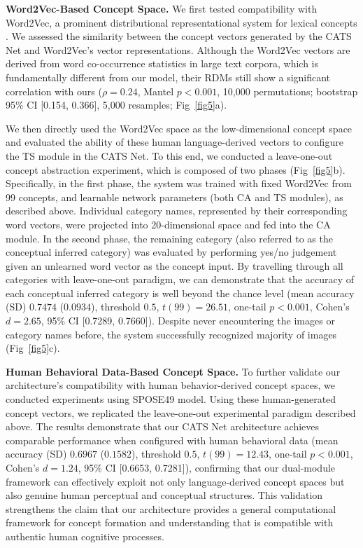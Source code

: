 \documentclass[pdflatex,sn-mathphys-num,lineno]{sn-jnl}%
\begin{document}
\begin{CJK}{UTF8}{gbsn}
\textbf{Word2Vec-Based Concept Space.} We first tested compatibility with Word2Vec, a prominent distributional representational system for lexical concepts \cite{mikolov_distributed_2013,mikolov_advances_2018}. We assessed the similarity between the concept vectors generated by the CATS Net and Word2Vec's vector representations. Although the Word2Vec vectors are derived from word co-occurrence statistics in large text corpora, which is fundamentally different from our model, their RDMs still show a significant correlation with ours ($\rho=0.24$, Mantel $p < 0.001$, 10,000 permutations; bootstrap 95\% CI [0.154, 0.366], 5,000 resamples; Fig~\ref{fig5}a). 

We then directly used the Word2Vec space as the low-dimensional concept space and evaluated the ability of these human language-derived vectors to configure the TS module in the CATS Net. To this end, we conducted a leave-one-out concept abstraction experiment, which is composed of two phases (Fig~\ref{fig5}b). Specifically, in the first phase, the system was trained with fixed Word2Vec from 99 concepts, and learnable network parameters (both CA and TS modules), as described above. Individual category names, represented by their corresponding word vectors, were projected into 20-dimensional space and fed into the CA module. In the second phase, the remaining category (also referred to as the conceptual inferred category) was evaluated by performing yes/no judgement given an unlearned word vector as the concept input. By travelling through all categories with leave-one-out paradigm, we can demonstrate that the accuracy of each conceptual inferred category is well beyond the chance level (mean accuracy (SD) $0.7474$ ($0.0934$), threshold $0.5$, $t(99)=26.51$, one-tail $p < 0.001$, Cohen's $d = 2.65$, 95\% CI [0.7289, 0.7660]). Despite never encountering the images or category names before, the system successfully recognized majority of images (Fig~\ref{fig5}c).

\textbf{Human Behavioral Data-Based Concept Space.} To further validate our architecture's compatibility with human behavior-derived concept spaces, we conducted experiments using SPOSE49 model. Using these human-generated concept vectors, we replicated the leave-one-out experimental paradigm described above. The results demonstrate that our CATS Net architecture achieves comparable performance when configured with human behavioral data (mean accuracy (SD) $0.6967$ ($0.1582$), threshold $0.5$, $t(99)=12.43$, one-tail $p < 0.001$, Cohen's $d = 1.24$, 95\% CI [0.6653, 0.7281]), confirming that our dual-module framework can effectively exploit not only language-derived concept spaces but also genuine human perceptual and conceptual structures. This validation strengthens the claim that our architecture provides a general computational framework for concept formation and understanding that is compatible with authentic human cognitive processes.


\end{CJK}
\end{document}
